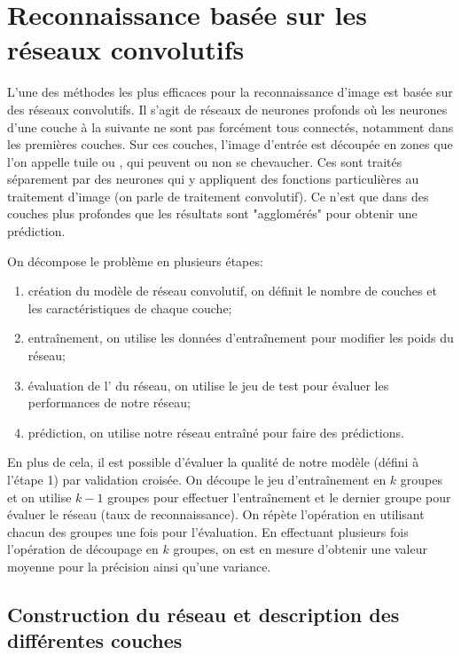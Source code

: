 
\chapter{Reconnaissance basée sur les réseaux convolutifs}

L'une des méthodes les plus efficaces pour la reconnaissance 
d'image est basée sur des réseaux convolutifs. 
Il s'agit de réseaux de neurones profonds où les neurones 
d'une couche à la suivante ne sont pas forcément tous connectés, 
notamment dans les premières couches.
Sur ces couches, l'image d'entrée est découpée en zones que l'on 
appelle tuile ou , qui peuvent ou non se chevaucher.
Ces  sont traités séparement par des neurones qui 
y appliquent des fonctions particulières au traitement d'image
(on parle de traitement convolutif).
Ce n'est que dans des couches plus profondes que les résultats 
sont "agglomérés" pour obtenir une prédiction.

On décompose le problème en plusieurs étapes:
\begin{enumerate}
  \item création du modèle de réseau convolutif, on définit le nombre de 
  couches et les caractéristiques de chaque couche;
  \item entraînement, on utilise les données d'entraînement pour modifier les 
  poids du réseau;
  \item évaluation de l' du réseau, on utilise le jeu de test 
  pour évaluer les performances de notre réseau;
  \item prédiction, on utilise notre réseau entraîné pour faire des prédictions.
\end{enumerate}

En plus de cela, il est possible d'évaluer la qualité de notre modèle (défini 
à l'étape 1) par validation croisée. 
On découpe le jeu d'entraînement en $k$ groupes et on utilise $k-1$ groupes 
pour effectuer l'entraînement et le dernier groupe pour évaluer le réseau (taux 
de reconnaissance). 
On répète l'opération en utilisant chacun des groupes une fois pour l'évaluation.
En effectuant plusieurs fois l'opération de découpage en $k$ groupes, on 
est en mesure d'obtenir une valeur moyenne pour la précision ainsi qu'une variance. 



\section{Construction du réseau et description des différentes couches}

